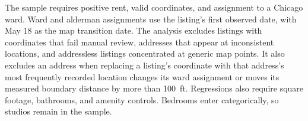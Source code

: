 The sample requires positive rent, valid coordinates, and assignment to a Chicago ward.
Ward and alderman assignments use the listing's first observed date, with May 18 as the map transition date.
The analysis excludes listings with coordinates that fail manual review, addresses that appear at inconsistent locations, and addressless listings concentrated at generic map points.
It also excludes an address when replacing a listing's coordinate with that address's most frequently recorded location changes its ward assignment or moves its measured boundary distance by more than 100~ft.
Regressions also require square footage, bathrooms, and amenity controls.
Bedrooms enter categorically, so studios remain in the sample.
